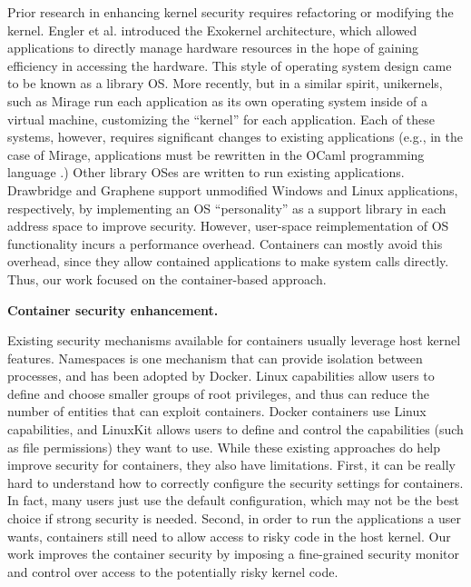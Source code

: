 Prior research in enhancing kernel security requires refactoring or modifying the kernel. 
Engler et al. \cite{Engler:1995:EOS:224056.224076} introduced the Exokernel architecture, which allowed applications to directly manage hardware resources in the hope of gaining efficiency in accessing the hardware. 
This style of operating system design came to be known as a library OS. More recently, but in a similar spirit, unikernels, 
such as Mirage \cite{Madhavapeddy:2013:ULO:2451116.2451167} run each application as its own operating system inside of a virtual machine, customizing the ``kernel'' for each application. 
Each of these systems, however, requires significant changes to existing applications (e.g., in the case of Mirage, applications must be rewritten in the OCaml programming language \cite{OCaml}.) 
Other library OSes are written to run existing applications. Drawbridge \cite{Porter:2011:RLO:1950365.1950399} and Graphene \cite{Tsai:2014:CSI:2592798.2592812} support unmodified Windows and Linux applications, 
respectively, by implementing an OS ``personality'' as a support library in each address space to improve security. 
However, user-space reimplementation of OS functionality incurs a performance overhead. Containers can mostly avoid this overhead, since they allow contained applications to make system calls directly. 
Thus, our work focused on the container-based approach. 

\textbf{Container security enhancement.} 

Existing security mechanisms available for containers usually leverage host kernel features. Namespaces \cite{namespaces} is one mechanism that can provide isolation between processes, and has been adopted by Docker. 
Linux capabilities \cite{linux-kernel-capabilities} allow users to define and choose smaller groups of root privileges, and thus can reduce the number of entities that can exploit  containers. 
Docker containers use Linux capabilities, and LinuxKit allows users to define and control the capabilities (such as file permissions) they want to use. 
While these existing approaches do help improve security for containers, they also have limitations. First, it can be really hard to understand how to correctly configure the security settings for containers. 
In fact, many users just use the default configuration, which may not be the best choice if strong security is needed. 
Second, in order to run the applications a user wants, containers still need  to allow access to risky code in the host kernel. 
Our work improves the container security by imposing a fine-grained security monitor and control over access to the potentially risky kernel code.